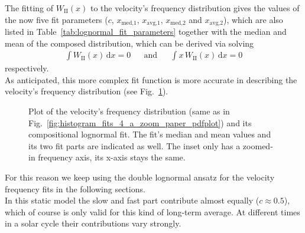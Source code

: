The fitting of $W_\text{II}(x)$ to the velocity's frequency distribution gives the values of the now five fit parameters ($c$, $x_\text{med,1}$, $x_\text{avg,1}$, $x_\text{med,2}$ and $x_\text{avg,2}$), which are also listed in Table~\ref{tab:lognormal_fit_parameters} together with the median and mean of the composed distribution, which can be derived via solving
\begin{align}
	\int W_\text{II}(x)\,\text{d}x = 0	&	&\text{and}	&	&\int x\,W_\text{II}(x)\,\text{d}x = 0
\end{align}
respectively.\\
As anticipated, this more complex fit function is more accurate in describing the velocity's frequency distribution (see Fig.~\ref{fig:histogram_fits_V_a_zoom_dbl_paper_pdfplot}).
\begin{figure}
	\caption{Plot of the velocity's frequency distribution (same as in Fig.~\ref{fig:histogram_fits_4_a_zoom_paper_pdfplot}) and its compositional lognormal fit. The fit's median and mean values and its two fit parts are indicated as well. The inset only has a zoomed-in frequency axis, its x-axis stays the same.}
	\label{fig:histogram_fits_V_a_zoom_dbl_paper_pdfplot}
\end{figure}
For this reason we keep using the double lognormal ansatz for the velocity frequency fits in the following sections.\\
In this static model the slow and fast part contribute almost equally ($c \approx 0.5$), which of course is only valid for this kind of long-term average. At different times in a solar cycle their contributions vary strongly.

